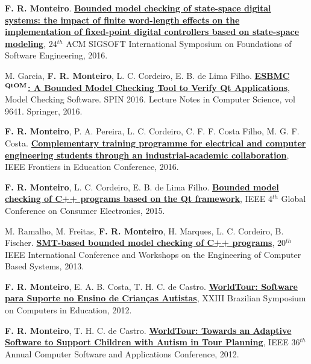 \documentclass[letterpaper]{article}
\renewenvironment{itemize}{
  \begin{list}{}{
    \setlength{\leftmargin}{1.5em}
  }
}{
  \end{list}
}
\begin{document}
\begin{itemize}
    \item {\bf F. R. Monteiro}. \href{http://dl.acm.org/citation.cfm?id=2983979}{{\bf Bounded model checking of state-space digital systems: the impact of finite word-length effects on the implementation of fixed-point digital controllers based on state-space modeling}},
  24$^{th}$ ACM SIGSOFT International Symposium on Foundations of Software Engineering, 2016.
  
  \item M. Garcia, {\bf F. R. Monteiro}, L. C. Cordeiro, E. B. de Lima Filho. \href{http://link.springer.com/chapter/10.1007/978-3-319-32582-8_6}{{\bf ESBMC$^{\bf QtOM}$: A Bounded Model Checking Tool to Verify Qt Applications}},
  Model Checking Software. SPIN 2016. Lecture Notes in Computer Science, vol 9641. Springer, 2016.

  \item {\bf F. R. Monteiro}, P. A. Pereira, L. C. Cordeiro, C. F. F. Costa Filho, M. G. F. Costa. \href{http://ieeexplore.ieee.org/abstract/document/7757421/}{{\bf Complementary training programme for electrical and computer engineering students through an industrial-academic collaboration}},
  IEEE Frontiers in Education Conference, 2016.
  
    \item {\bf F. R. Monteiro}, L. C. Cordeiro, E. B. de Lima Filho. \href{http://ieeexplore.ieee.org/abstract/document/7398699/}{{\bf Bounded model checking of C++ programs based on the Qt framework}},
  IEEE 4$^{th}$ Global Conference on Consumer Electronics, 2015.
    
  \item M. Ramalho, M. Freitas, {\bf F. R. Monteiro}, H. Marques, L. C. Cordeiro, B. Fischer. \href{http://ieeexplore.ieee.org/abstract/document/6601583/}{{\bf SMT-based bounded model checking of C++ programs}},
  20$^{th}$ IEEE International Conference and Workshops on the Engineering of Computer Based Systems, 2013.

    \item {\bf F. R. Monteiro}, E. A. B. Costa, T. H. C. de Castro. \href{http://www.br-ie.org/pub/index.php/sbie/article/view/1806}{{\bf WorldTour: Software para Suporte no Ensino de Crian{\c c}as Autistas}},
  XXIII Brazilian Symposium on Computers in Education, 2012.
    
    \item {\bf F. R. Monteiro}, T. H. C. de Castro. \href{http://ieeexplore.ieee.org/abstract/document/6340181/}{{\bf WorldTour: Towards an Adaptive Software to Support Children with Autism in Tour Planning}},
  IEEE 36$^{th}$ Annual Computer Software and Applications Conference, 2012.

\end{itemize}
\end{document}
